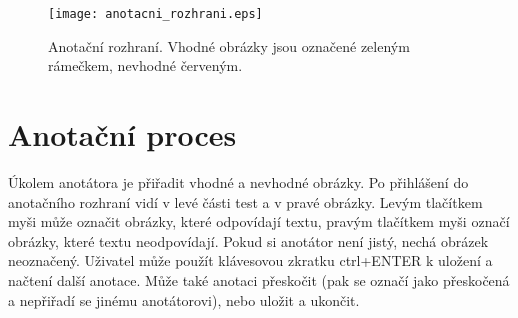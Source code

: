 \begin{figure}
  \centering
  \texttt{[image: anotacni\_rozhrani.eps]}
  \caption{Anotační rozhraní. Vhodné obrázky jsou označené zeleným rámečkem, nevhodné červeným.}
  \label{fig:anotacni_rozhrani}
\end{figure}

\section{Anotační proces}

Úkolem anotátora je přiřadit vhodné a nevhodné obrázky. Po přihlášení do anotačního rozhraní vidí v levé části test a v pravé obrázky. Levým tlačítkem myši může označit obrázky, které odpovídají textu, pravým tlačítkem myši označí obrázky, které textu neodpovídají. Pokud si anotátor není jistý, nechá obrázek neoznačený. Uživatel může použít klávesovou zkratku ctrl+ENTER k uložení a načtení další anotace. Může také anotaci přeskočit (pak se označí jako přeskočená a nepřiřadí se jinému anotátorovi), nebo uložit a ukončit.



